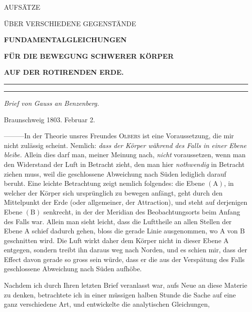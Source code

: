 \clearpage
{}
\thispagestyle{empty}
\vspace*{.28\textheight}
\begin{center}
{\Large{}AUFSÄTZE\par}
\vspace{.09\textheight}
{\large ÜBER VERSCHIEDENE GEGENSTÄNDE\par}
\vspace{.09\textheight}
\end{center}
\clearpage
{}
\GaussVSourceUnnumbered
\vspace*{.148\textheight}
\begin{center}
{\large\bfseries FUNDAMENTALGLEICHUNGEN\par}
\smallskip
{\Large\bfseries FÜR DIE BEWEGUNG SCHWERER KÖRPER\par}
\smallskip
{\normalsize\bfseries AUF DER ROTIRENDEN ERDE.\par}
\medskip
\rule{.62\linewidth}{.35pt}\par
{}\par
\rule{.62\linewidth}{.35pt}\par
\medskip
{\large\itshape Brief von Gauss an Benzenberg.\par}
\end{center}
\noindent\hfill{\small Braunschweig 1803. Februar 2.}\hspace*{.06\linewidth}\par
—\quad—\quad—\quad In der Theorie unsres Freundes \textsc{Olbers} ist eine Voraussetzung, die mir nicht zulässig scheint. Nemlich: \textit{dass der Körper während des Falls in einer Ebene bleibe.} Allein dies darf man, meiner Meinung nach, \textit{nicht} voraussetzen, wenn man den Widerstand der Luft in Betracht zieht, den man hier \textit{nothwendig} in Betracht ziehen muss, weil die geschlossene Abweichung nach Süden lediglich darauf beruht. Eine leichte Betrachtung zeigt nemlich folgendes: die Ebene $(\mathrm{A})$, in welcher der Körper sich ursprünglich zu bewegen anfängt, geht durch den Mittelpunkt der Erde (oder allgemeiner, der Attraction), und steht auf derjenigen Ebene $(\mathrm{B})$ senkrecht, in der der Meridian des Beobachtungsorts beim Anfang des Falls war. Allein man sieht leicht, dass die Lufttheile an allen Stellen der Ebene $\mathrm{A}$ schief dadurch gehen, bloss die gerade Linie ausgenommen, wo $\mathrm{A}$ von $\mathrm{B}$ geschnitten wird. Die Luft wirkt daher dem Körper nicht in dieser Ebene $\mathrm{A}$ entgegen, sondern treibt ihn daraus weg nach Norden, und es schien mir, dass der Effect davon gerade so gross sein würde, dass er die aus der Verspätung des Falls geschlossene Abweichung nach Süden aufhöbe.

Nachdem ich durch Ihren letzten Brief veranlasst war, aufs Neue an diese Materie zu denken, betrachtete ich in einer müssigen halben Stunde die Sache auf eine ganz verschiedene Art, und entwickelte die analytischen Gleichungen,
